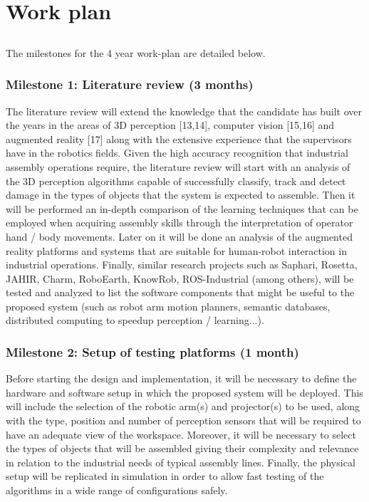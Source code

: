 \chapter{Work plan}\label{chap:work-plan}

\section*{}

The milestones for the 4 year work-plan are detailed below.


\subsection{Milestone 1: Literature review (3 months)}

The literature review will extend the knowledge that the candidate has built over the years in the areas of 3D perception [13,14], computer vision [15,16] and augmented reality [17] along with the extensive experience that the supervisors have in the robotics fields. Given the high accuracy recognition that industrial assembly operations require, the literature review will start with an analysis of the 3D perception algorithms capable of successfully classify, track and detect damage in the types of objects that the system is expected to assemble. Then it will be performed an in-depth comparison of the learning techniques that can be employed when acquiring assembly skills through the interpretation of operator hand / body movements. Later on it will be done an analysis of the augmented reality platforms and systems that are suitable for human-robot interaction in industrial operations. Finally, similar research projects such as Saphari, Rosetta, JAHIR, Charm, RoboEarth, KnowRob, ROS-Industrial (among others), will be tested and analyzed to list the software components that might be useful to the proposed system (such as robot arm motion planners, semantic databases, distributed computing to speedup perception / learning...).


\subsection{Milestone 2: Setup of testing platforms (1 month)}

Before starting the design and implementation, it will be necessary to define the hardware and software setup in which the proposed system will be deployed. This will include the selection of the robotic arm(s) and projector(s) to be used, along with the type, position and number of perception sensors that will be required to have an adequate view of the workspace. Moreover, it will be necessary to select the types of objects that will be assembled giving their complexity and relevance in relation to the industrial needs of typical assembly lines. Finally, the physical setup will be replicated in simulation in order to allow fast testing of the algorithms in a wide range of configurations safely.


